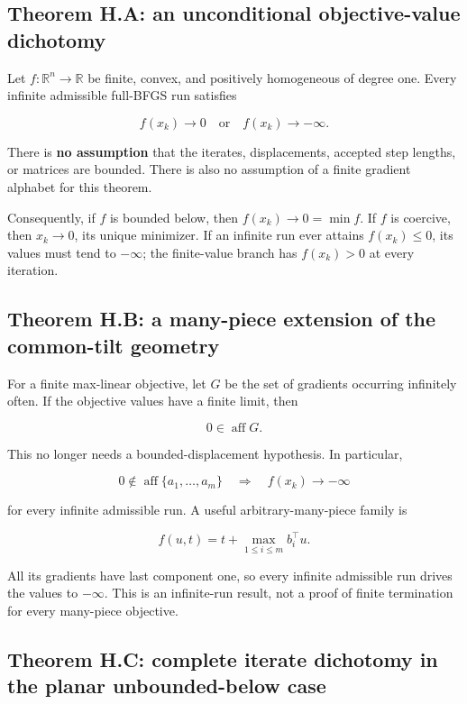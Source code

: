 \documentclass[10pt,oneside,openany]{book}
\theoremstyle{remark}\newtheorem{remark}{Remark}[chapter]
\begin{document}
\subsection{Theorem H.A: an unconditional objective-value
dichotomy}\label{H:theorem-a-an-unconditional-objective-value-dichotomy}

Let \(f:\mathbb R^n\to\mathbb R\) be finite, convex, and positively
homogeneous of degree one. Every infinite admissible full-BFGS run
satisfies

\[
\boxed{f(x_k)\longrightarrow0\quad\text{or}\quad f(x_k)\longrightarrow-\infty.}
\]

There is \textbf{no assumption} that the iterates, displacements,
accepted step lengths, or matrices are bounded. There is also no
assumption of a finite gradient alphabet for this theorem.

Consequently, if \(f\) is bounded below, then \(f(x_k)\to0=\min f\). If
\(f\) is coercive, then \(x_k\to0\), its unique minimizer. If an
infinite run ever attains \(f(x_k)\le0\), its values must tend to
\(-\infty\); the finite-value branch has \(f(x_k)>0\) at every
iteration.

\subsection{Theorem H.B: a many-piece extension of the common-tilt
geometry}\label{H:theorem-b-a-many-piece-extension-of-the-common-tilt-geometry}

For a finite max-linear objective, let \(G\) be the set of gradients
occurring infinitely often. If the objective values have a finite limit,
then

\[
\boxed{0\in\operatorname{aff}G.}
\]

This no longer needs a bounded-displacement hypothesis. In particular,

\[
0\notin\operatorname{aff}\{a_1,\ldots,a_m\}
\quad\Longrightarrow\quad
f(x_k)\longrightarrow-\infty
\]

for every infinite admissible run. A useful arbitrary-many-piece family
is

\[
\boxed{f(u,t)=t+\max_{1\le i\le m}b_i^\top u.}
\]

All its gradients have last component one, so every infinite admissible
run drives the values to \(-\infty\). This is an infinite-run result,
not a proof of finite termination for every many-piece objective.

\subsection{Theorem H.C: complete iterate dichotomy in the planar
unbounded-below
case}\label{H:theorem-c-complete-iterate-dichotomy-in-the-planar-unbounded-below-case}
\end{document}
